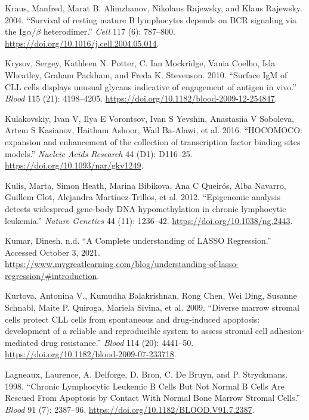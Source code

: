 \documentclass[11pt, a4paper, twosided]{book}
\newenvironment{CSLReferences}%
  {}%
  {\par}
\begin{document}
\begin{CSLReferences}{1}{0}
\leavevmode{}%
Kraus, Manfred, Marat B. Alimzhanov, Nikolaus Rajewsky, and Klaus Rajewsky. 2004. {``{Survival of resting mature B lymphocytes depends on BCR signaling via the Ig\(\alpha\)/\(\beta\) heterodimer}.''} \emph{Cell} 117 (6): 787--800. \url{https://doi.org/10.1016/j.cell.2004.05.014}.

\leavevmode{}%
Krysov, Sergey, Kathleen N. Potter, C. Ian Mockridge, Vania Coelho, Isla Wheatley, Graham Packham, and Freda K. Stevenson. 2010. {``{Surface IgM of CLL cells displays unusual glycans indicative of engagement of antigen in vivo}.''} \emph{Blood} 115 (21): 4198--4205. \url{https://doi.org/10.1182/blood-2009-12-254847}.

\leavevmode{}%
Kulakovskiy, Ivan V, Ilya E Vorontsov, Ivan S Yevshin, Anastasiia V Soboleva, Artem S Kasianov, Haitham Ashoor, Wail Ba-Alawi, et al. 2016. {``{HOCOMOCO: expansion and enhancement of the collection of transcription factor binding sites models.}''} \emph{Nucleic Acids Research} 44 (D1): D116--25. \url{https://doi.org/10.1093/nar/gkv1249}.

\leavevmode{}%
Kulis, Marta, Simon Heath, Marina Bibikova, Ana C Queirós, Alba Navarro, Guillem Clot, Alejandra Martínez-Trillos, et al. 2012. {``{Epigenomic analysis detects widespread gene-body DNA hypomethylation in chronic lymphocytic leukemia}.''} \emph{Nature Genetics} 44 (11): 1236--42. \url{https://doi.org/10.1038/ng.2443}.

\leavevmode{}%
Kumar, Dinesh. n.d. {``{A Complete understanding of LASSO Regression}.''} Accessed October 3, 2021. \url{https://www.mygreatlearning.com/blog/understanding-of-lasso-regression/\#introduction}.

\leavevmode{}%
Kurtova, Antonina V., Kumudha Balakrishnan, Rong Chen, Wei Ding, Susanne Schnabl, Maite P. Quiroga, Mariela Sivina, et al. 2009. {``{Diverse marrow stromal cells protect CLL cells from spontaneous and drug-induced apoptosis: development of a reliable and reproducible system to assess stromal cell adhesion-mediated drug resistance}.''} \emph{Blood} 114 (20): 4441--50. \url{https://doi.org/10.1182/blood-2009-07-233718}.

\leavevmode{}%
Lagneaux, Laurence, A. Delforge, D. Bron, C. De Bruyn, and P. Stryckmans. 1998. {``{Chronic Lymphocytic Leukemic B Cells But Not Normal B Cells Are Rescued From Apoptosis by Contact With Normal Bone Marrow Stromal Cells}.''} \emph{Blood} 91 (7): 2387--96. \url{https://doi.org/10.1182/BLOOD.V91.7.2387}.


\end{CSLReferences}
\end{document}
